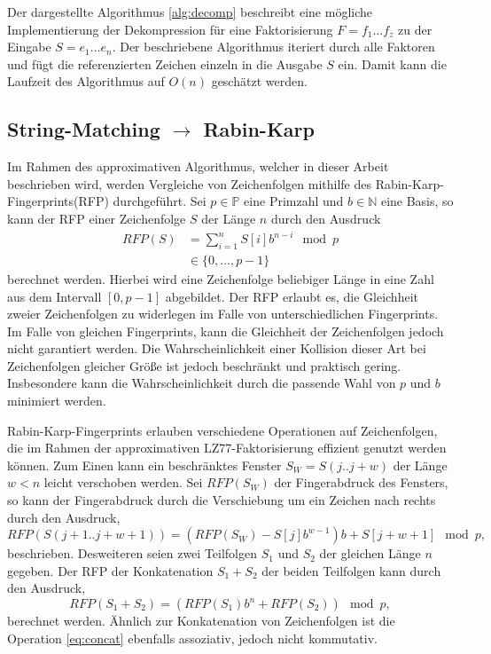 Der dargestellte Algorithmus \ref{alg:decomp} beschreibt eine mögliche Implementierung der Dekompression für eine Faktorisierung $F=f_1...f_z$ zu der Eingabe $S=e_1...e_n$.
Der beschriebene Algorithmus iteriert durch alle Faktoren und fügt die referenzierten Zeichen einzeln in die Ausgabe $S$ ein. Damit kann die Laufzeit des Algorithmus auf $O(n)$
geschätzt werden.

\subsection{String-Matching $\rightarrow$ Rabin-Karp}
Im Rahmen des approximativen Algorithmus, welcher in dieser Arbeit beschrieben wird, werden Vergleiche von Zeichenfolgen mithilfe des Rabin-Karp-Fingerprints(RFP) durchgeführt. Sei
$p\in \mathbb{P}$ eine Primzahl und $b\in \mathbb{N}$ eine Basis, so kann der RFP einer Zeichenfolge $S$ der Länge $n$ durch den Ausdruck
\begin{equation}
    \begin{split}
    RFP(S) &= \sum_{i=1}^{n} S[i]b^{n-i} \mod p \\
    &\in \{0,...,p-1\}
    \end{split}
\end{equation}
berechnet werden. Hierbei wird eine Zeichenfolge beliebiger Länge in eine Zahl aus dem Intervall $[0,p-1]$ abgebildet. Der RFP erlaubt es, die Gleichheit zweier Zeichenfolgen zu widerlegen
im Falle von unterschiedlichen Fingerprints. Im Falle von gleichen Fingerprints, kann die Gleichheit der Zeichenfolgen jedoch nicht garantiert werden. Die Wahrscheinlichkeit einer Kollision 
dieser Art bei Zeichenfolgen gleicher Größe ist jedoch beschränkt und praktisch gering. Insbesondere kann die Wahrscheinlichkeit durch die passende Wahl von $p$ und $b$ minimiert werden.

Rabin-Karp-Fingerprints erlauben verschiedene Operationen auf Zeichenfolgen, die im Rahmen der approximativen LZ77-Faktorisierung effizient genutzt werden können. Zum Einen kann ein
beschränktes Fenster $S_{W} = S(j..j+w)$ der Länge $w<n$ leicht verschoben werden. Sei $RFP(S_{W})$ der Fingerabdruck des Fensters, so kann der Fingerabdruck
durch die Verschiebung um ein Zeichen nach rechts durch den Ausdruck,
\begin{equation}
    RFP(S(j+1..j+w+1)) = (RFP(S_W) - S[j]b^{w-1})b + S[j+w+1] \mod p,
\end{equation}
beschrieben. Desweiteren seien zwei Teilfolgen $S_1$ und $S_2$ der gleichen Länge $n$ gegeben. Der RFP der Konkatenation $S_1+S_2$ der beiden Teilfolgen kann durch den Ausdruck,
\begin{equation} \label{eq:concat}
    RFP(S_1 + S_2) = (RFP(S_1)b^n + RFP(S_2)) \mod p,
\end{equation}
berechnet werden. Ähnlich zur Konkatenation von Zeichenfolgen ist die Operation \ref{eq:concat} ebenfalls assoziativ, jedoch nicht kommutativ.

